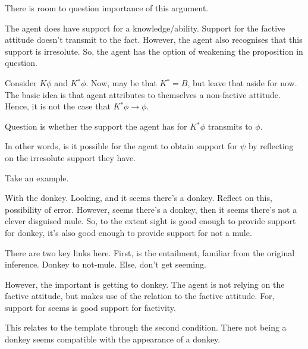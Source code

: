 \documentclass[10pt]{article}
\newcommand{\nf}[1]{#1\ensuremath{^{{*}}}}
\begin{document}
\begin{note}
  There is room to question importance of this argument.

  The agent does have support for a knowledge/ability.
  Support for the factive attitude doesn't transmit to the fact.
  However, the agent also recognises that this support is irresolute.
  So, the agent has the option of weakening the proposition in question.

  Consider \(K\phi\) and \(\nf{K}\phi\).
  Now, may be that \(\nf{K} = B\), but leave that aside for now.
  The basic idea is that agent attributes to themselves a non-factive attitude.
  Hence, it is not the case that \(\nf{K}\phi \rightarrow \phi\).

  Question is whether the support the agent has for \(\nf{K}\phi\) transmits to \(\phi\).

  In other words, is it possible for the agent to obtain support for \(\psi\) by reflecting on the irresolute support they have.

  Take an example.

  With the donkey.
  Looking, and it seems there's a donkey.
  Reflect on this, possibility of error.
  However, seems there's a donkey, then it seems there's not a clever disguised mule.
  So, to the extent sight is good enough to provide support for donkey, it's also good enough to provide support for not a mule.

  {
    \color{red}
    There are two key links here.
    First, is the entailment, familiar from the original inference.
    Donkey to not-mule.
    Else, don't get seeming.

    However, the important is getting to donkey.
    The agent is not relying on the factive attitude, but makes use of the relation to the factive attitude.
    For, support for seems is good support for factivity.
  }

  This relates to the template through the second condition.
  There not being a donkey seems compatible with the appearance of a donkey.




\end{note}
\end{document}

